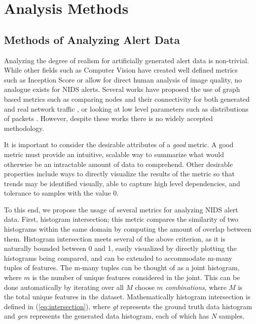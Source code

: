\chapter{Analysis Methods}


\section{Methods of Analyzing Alert Data}
\label{sec:anal}
Analyzing the degree of realism for artificially generated alert data is non-trivial. While other fields such as Computer Vision have created well defined metrics such as Inception Score \cite{Salimans2016} or allow for direct human analysis of image quality, no analogue exists for NIDS alerts. Several works have proposed the use of graph based metrics such as comparing nodes and their connectivity for both generated and real network traffic \cite{Siska2010, Iannucci}, or looking at low level parameters such as distributions of packets \cite{Sommers2004, Botta2012}. However, despite these works there is no widely accepted methodology.

It is important to consider the desirable attributes of a \emph{good} metric. A good metric must provide an intuitive, scalable way to summarize what would otherwise be an intractable amount of data to comprehend. Other desirable properties include ways to directly visualize the results of the metric so that trends may be identified visually, able to capture high level dependencies, and tolerance to samples with the value $0$. 

To this end, we propose the usage of several metrics for analyzing NIDS alert data. First, histogram intersection; this metric compares the similarity of two histograms within the same domain by computing the amount of overlap between them. Histogram intersection meets several of the above criterion, as it is naturally bounded between 0 and 1, easily visualized by directly plotting the histograms being compared, and can be extended to accommodate m-many tuples of features. The m-many tuples can be thought of as a joint histogram, where $m$ is the number of unique features considered in the joint. This can be done automatically by iterating over all $M$ choose $m$ \emph{combinations}, where $M$ is the total unique features in the dataset. Mathematically histogram intersection is defined in (\ref{eq:intersection}), where \emph{gt} represents the ground truth data histogram and \emph{gen} represents the generated data histogram, each of which has $N$ samples.

